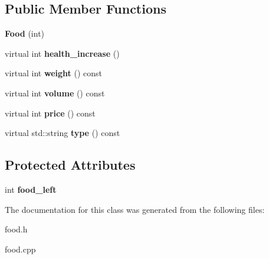 \subsection*{Public Member Functions}
\begin{DoxyCompactItemize}
\item 
\hypertarget{classda__game_1_1Food_ace85d7a8d2b7ae667e8e6d4dc4ec643b}{
{\bfseries Food} (int)}
\label{classda__game_1_1Food_ace85d7a8d2b7ae667e8e6d4dc4ec643b}

\item 
\hypertarget{classda__game_1_1Food_a115b3f00c2184d44adb4252797147f96}{
virtual int {\bfseries health\_\-increase} ()}
\label{classda__game_1_1Food_a115b3f00c2184d44adb4252797147f96}

\item 
\hypertarget{classda__game_1_1Food_a55206a8d4aa3087dce11e629e19befa6}{
virtual int {\bfseries weight} () const }
\label{classda__game_1_1Food_a55206a8d4aa3087dce11e629e19befa6}

\item 
\hypertarget{classda__game_1_1Food_a892fdedaedee16235e95522e618d3631}{
virtual int {\bfseries volume} () const }
\label{classda__game_1_1Food_a892fdedaedee16235e95522e618d3631}

\item 
\hypertarget{classda__game_1_1Food_ad4459dbe0fa30adca487386c91e2a060}{
virtual int {\bfseries price} () const }
\label{classda__game_1_1Food_ad4459dbe0fa30adca487386c91e2a060}

\item 
\hypertarget{classda__game_1_1Food_a0b0cb45b8b004e061a06faf76d6d855d}{
virtual std::string {\bfseries type} () const }
\label{classda__game_1_1Food_a0b0cb45b8b004e061a06faf76d6d855d}

\end{DoxyCompactItemize}
\subsection*{Protected Attributes}
\begin{DoxyCompactItemize}
\item 
\hypertarget{classda__game_1_1Food_ae76b10729eed85aff9a77e6193df89cd}{
int {\bfseries food\_\-left}}
\label{classda__game_1_1Food_ae76b10729eed85aff9a77e6193df89cd}

\end{DoxyCompactItemize}


The documentation for this class was generated from the following files:\begin{DoxyCompactItemize}
\item 
food.h\item 
food.cpp\end{DoxyCompactItemize}
